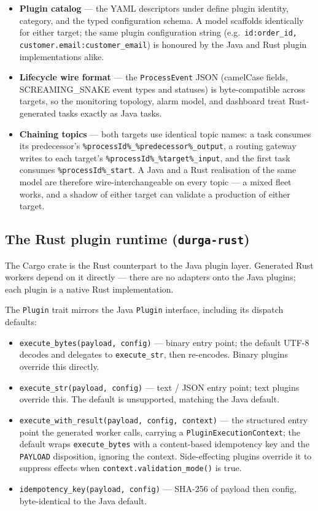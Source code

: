 \begin{itemize}
\item \textbf{Plugin catalog} --- the YAML descriptors under 
  define plugin identity, category, and the typed configuration schema. A model
  scaffolds identically for either target; the same plugin configuration string
  (e.g.\ \texttt{id:order\_id, customer.email:customer\_email}) is honoured by the
  Java and Rust plugin implementations alike.
\item \textbf{Lifecycle wire format} --- the \texttt{ProcessEvent} JSON (camelCase
  fields, SCREAMING\_SNAKE event types and statuses) is byte-compatible across
  targets, so the monitoring topology, alarm model, and dashboard treat
  Rust-generated tasks exactly as Java tasks.
\item \textbf{Chaining topics} --- both targets use identical topic names: a task
  consumes its predecessor's \texttt{\%processId\%\_\%predecessor\%\_output}, a routing
  gateway writes to each target's \texttt{\%processId\%\_\%target\%\_input}, and the
  first task consumes \texttt{\%processId\%\_start}. A Java and a Rust realisation of the
  same model are therefore wire-interchangeable on every topic --- a mixed fleet works,
  and a shadow of either target can validate a production of either target.
\end{itemize}

\subsection{The Rust plugin runtime (\texttt{durga-rust})}

The  Cargo crate is the Rust counterpart to the Java
 plugin layer. Generated Rust workers depend on it
directly --- there are no adapters onto the Java plugins; each plugin is a native
Rust implementation.

The \texttt{Plugin} trait mirrors the Java \texttt{Plugin} interface, including its
dispatch defaults:

\begin{itemize}
\item \texttt{execute\_bytes(payload, config)} --- binary entry point; the default
  UTF-8 decodes and delegates to \texttt{execute\_str}, then re-encodes. Binary
  plugins override this directly.
\item \texttt{execute\_str(payload, config)} --- text / JSON entry point; text
  plugins override this. The default is unsupported, matching the Java default.
\item \texttt{execute\_with\_result(payload, config, context)} --- the structured
  entry point the generated worker calls, carrying a \texttt{PluginExecutionContext};
  the default wraps \texttt{execute\_bytes} with a content-based idempotency key and the
  \texttt{PAYLOAD} disposition, ignoring the context. Side-effecting plugins override it
  to suppress effects when \texttt{context.validation\_mode()} is true.
\item \texttt{idempotency\_key(payload, config)} --- SHA-256 of payload then
  config, byte-identical to the Java default.
\end{itemize}

